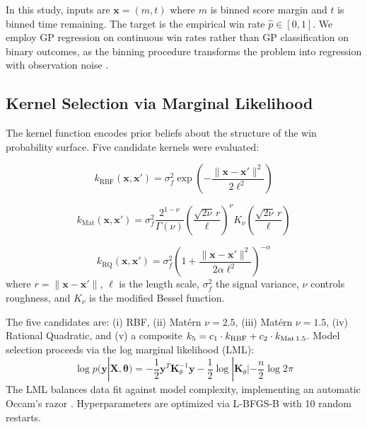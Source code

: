 \documentclass[conference]{IEEEtran}
\begin{document}
In this study, inputs are $\mathbf{x} = (m, t)$ where $m$ is binned score margin and $t$ is binned time remaining. The target is the empirical win rate $\hat{p} \in [0, 1]$. We employ GP regression on continuous win rates rather than GP classification on binary outcomes, as the binning procedure transforms the problem into regression with observation noise \cite{bishop2006}.

\subsection{Kernel Selection via Marginal Likelihood}

The kernel function encodes prior beliefs about the structure of the win probability surface. Five candidate kernels were evaluated:

\begin{equation}
k_{\text{RBF}}(\mathbf{x}, \mathbf{x}') = \sigma_f^2 \exp\!\left(-\frac{\|\mathbf{x} - \mathbf{x}'\|^2}{2\ell^2}\right)
\end{equation}

\begin{equation}
k_{\text{Mat}}(\mathbf{x}, \mathbf{x}') = \sigma_f^2 \frac{2^{1-\nu}}{\Gamma(\nu)} \left(\frac{\sqrt{2\nu}\,r}{\ell}\right)^\nu K_\nu\!\left(\frac{\sqrt{2\nu}\,r}{\ell}\right)
\end{equation}

\begin{equation}
k_{\text{RQ}}(\mathbf{x}, \mathbf{x}') = \sigma_f^2 \left(1 + \frac{\|\mathbf{x} - \mathbf{x}'\|^2}{2\alpha \ell^2}\right)^{-\alpha}
\end{equation}
%
where $r = \|\mathbf{x} - \mathbf{x}'\|$, $\ell$ is the length scale, $\sigma_f^2$ the signal variance, $\nu$ controls roughness, and $K_\nu$ is the modified Bessel function.

The five candidates are: (i) RBF, (ii) Mat\'{e}rn $\nu\!=\!2.5$, (iii) Mat\'{e}rn $\nu\!=\!1.5$, (iv) Rational Quadratic, and (v) a composite $k_5 = c_1 \cdot k_{\text{RBF}} + c_2 \cdot k_{\text{Mat\,1.5}}$. Model selection proceeds via the log marginal likelihood (LML):
%
\begin{equation}
\log p(\mathbf{y} | \mathbf{X}, \boldsymbol{\theta}) = -\frac{1}{2}\mathbf{y}^T\mathbf{K}_\theta^{-1}\mathbf{y} - \frac{1}{2}\log|\mathbf{K}_\theta| - \frac{n}{2}\log 2\pi
\label{eq:lml}
\end{equation}
%
The LML balances data fit against model complexity, implementing an automatic Occam's razor \cite{rasmussen2006}. Hyperparameters are optimized via L-BFGS-B with 10 random restarts.
\end{document}
